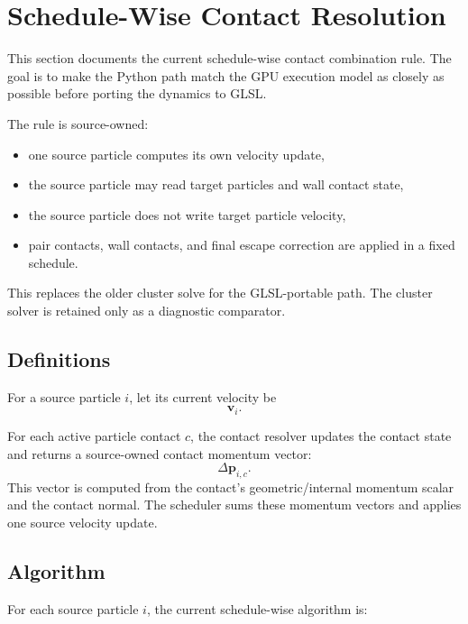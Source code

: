 \section{Schedule-Wise Contact Resolution}

This section documents the current schedule-wise contact combination rule. The
goal is to make the Python path match the GPU execution model as closely as
possible before porting the dynamics to GLSL.

The rule is source-owned:
\begin{itemize}
    \item one source particle computes its own velocity update,
    \item the source particle may read target particles and wall contact state,
    \item the source particle does not write target particle velocity,
    \item pair contacts, wall contacts, and final escape correction are applied
          in a fixed schedule.
\end{itemize}

This replaces the older cluster solve for the GLSL-portable path. The cluster
solver is retained only as a diagnostic comparator.

\subsection{Definitions}

For a source particle \(i\), let its current velocity be
\[
    \mathbf{v}_i .
\]

For each active particle contact \(c\), the contact resolver updates the
contact state and returns a source-owned contact momentum vector:
\[
    \Delta \mathbf{p}_{i,c}.
\]
This vector is computed from the contact's geometric/internal momentum scalar
and the contact normal.  The scheduler sums these momentum vectors and applies
one source velocity update.

\subsection{Algorithm}

For each source particle \(i\), the current schedule-wise algorithm is:

